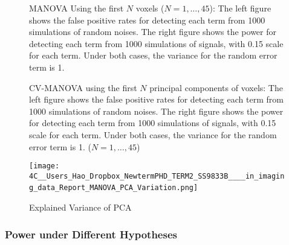 \begin{figure}[t]
\begin{centering}
\par\end{centering}

\centering{}\protect\caption{{\footnotesize{}MANOVA Using the first $N$ voxels ($N=1,\ldots,45$):
The left figure shows the false positive rates for detecting each
term from 1000 simulations of random noises. The right figure shows
the power for detecting each term from 1000 simulations of signals,
with 0.15 scale for each term. Under both cases, the variance for
the random error term is 1.}\label{fig:MANOVA1} }
\end{figure}


\begin{figure}[t]
\centering{}
\protect\caption{{\footnotesize{}CV-MANOVA using the first $N$ principal components
of voxels: The left figure shows the false positive rates for detecting
each term from 1000 simulations of random noises. The right figure
shows the power for detecting each term from 1000 simulations of signals,
with 0.15 scale for each term. Under both cases, the variance for
the random error term is 1. ($N=1,\ldots,45$) }{\small{}\label{fig:CV-MANOVA-PCA}}}
\end{figure}


\begin{figure}[ht]
\centering{}\texttt{[image: 4C\_\_Users\_Hao\_Dropbox\_NewtermPHD\_TERM2\_SS9833B\_\_\_\_in\_imaging\_data\_Report\_MANOVA\_PCA\_Variation.png]}\
\protect\caption{Explained Variance of PCA\label{fig:Explained-Variance-of}}
\end{figure}



\subsubsection{Power under Different Hypotheses}

